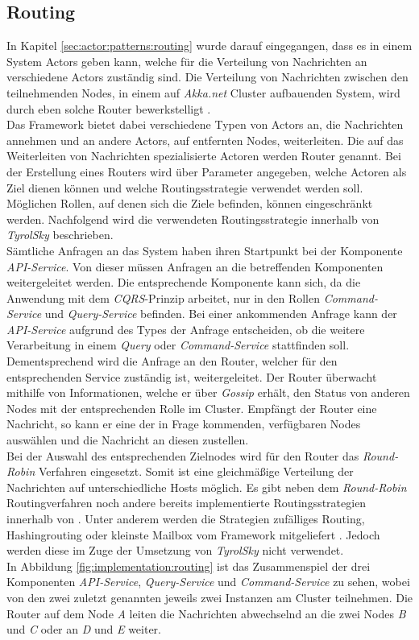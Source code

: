 \subsection{Routing}
\label{subsec:implementation:akkaRouting}
In Kapitel \ref{sec:actor:patterns:routing} wurde darauf eingegangen, dass es in einem System Actors geben kann, welche für die Verteilung von Nachrichten an verschiedene Actors zuständig sind. Die Verteilung von Nachrichten zwischen den teilnehmenden Nodes, in einem auf \textit{Akka.net} Cluster aufbauenden System, wird durch eben solche Router bewerkstelligt \citep{Akka.netCommunityAkka.NETDocumentation}. \\
Das Framework bietet dabei verschiedene Typen von Actors an, die Nachrichten annehmen und an andere Actors, auf entfernten Nodes, weiterleiten. Die auf das Weiterleiten von Nachrichten spezialisierte Actoren werden Router genannt. Bei der Erstellung eines Routers wird über Parameter angegeben, welche Actoren als Ziel dienen können und welche Routingsstrategie verwendet werden soll. Möglichen Rollen, auf denen sich die Ziele befinden, können eingeschränkt werden. Nachfolgend wird die verwendeten Routingsstrategie innerhalb von \textit{TyrolSky} beschrieben. \\
Sämtliche Anfragen an das System haben ihren Startpunkt bei der Komponente \textit{API-Service}. Von dieser müssen Anfragen an die betreffenden Komponenten weitergeleitet werden. Die entsprechende Komponente kann sich, da die Anwendung mit dem \textit{CQRS}-Prinzip arbeitet, nur in den Rollen \textit{Command-Service} und \textit{Query-Service} befinden. Bei einer ankommenden Anfrage kann der \textit{API-Service} aufgrund des Types der Anfrage entscheiden, ob die weitere Verarbeitung in einem \textit{Query} oder \textit{Command-Service} stattfinden soll. Dementsprechend wird die Anfrage an den Router, welcher für den entsprechenden Service zuständig ist, weitergeleitet. Der Router überwacht mithilfe von Informationen, welche er über \textit{Gossip} erhält, den Status von anderen Nodes mit der entsprechenden Rolle im Cluster. Empfängt der Router eine Nachricht, so kann er eine der in Frage kommenden, verfügbaren Nodes auswählen und die Nachricht an diesen zustellen. \\
Bei der Auswahl des entsprechenden Zielnodes wird für den Router das \textit{Round-Robin} Verfahren eingesetzt. Somit ist eine gleichmäßige Verteilung der Nachrichten auf unterschiedliche Hosts möglich. Es gibt neben dem \textit{Round-Robin} Routingverfahren noch andere bereits implementierte Routingsstrategien innerhalb von . Unter anderem werden die Strategien zufälliges Routing, Hashingrouting oder kleinste Mailbox vom Framework mitgeliefert \citep{Akka.netCommunityAkka.NETDocumentation}. Jedoch werden diese im Zuge der Umsetzung von \textit{TyrolSky} nicht verwendet. \\
In Abbildung \ref{fig:implementation:routing} ist das Zusammenspiel der drei Komponenten \textit{API-Service}, \textit{Query-Service} und \textit{Command-Service} zu sehen, wobei von den zwei zuletzt genannten jeweils zwei Instanzen am Cluster teilnehmen. Die Router auf dem Node \textit{A} leiten die Nachrichten abwechselnd an die zwei Nodes \textit{B} und \textit{C} oder an \textit{D} und \textit{E} weiter. 

